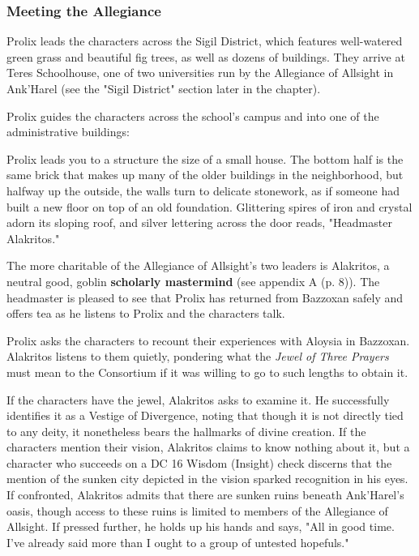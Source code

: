 \documentclass[letterpaper, 11pt, bg=full, twocolumn]{dndbook}
\begin{document}
\subsubsection{Meeting the Allegiance}

Prolix leads the characters across the Sigil District, which features well-watered green grass and beautiful fig trees, as well as dozens of buildings. They arrive at Teres Schoolhouse, one of two universities run by the Allegiance of Allsight in Ank'Harel (see the "Sigil District" section later in the chapter).

Prolix guides the characters across the school's campus and into one of the administrative buildings:

\begin{DndReadAloud}
Prolix leads you to a structure the size of a small house. The bottom half is the same brick that makes up many of the older buildings in the neighborhood, but halfway up the outside, the walls turn to delicate stonework, as if someone had built a new floor on top of an old foundation. Glittering spires of iron and crystal adorn its sloping roof, and silver lettering across the door reads, "Headmaster Alakritos."
\end{DndReadAloud}

The more charitable of the Allegiance of Allsight's two leaders is Alakritos, a neutral good, goblin \textbf{scholarly mastermind} (see appendix A (p. 8)). The headmaster is pleased to see that Prolix has returned from Bazzoxan safely and offers tea as he listens to Prolix and the characters talk.

Prolix asks the characters to recount their experiences with Aloysia in Bazzoxan. Alakritos listens to them quietly, pondering what the \textit{Jewel of Three Prayers} must mean to the Consortium if it was willing to go to such lengths to obtain it.

If the characters have the jewel, Alakritos asks to examine it. He successfully identifies it as a Vestige of Divergence, noting that though it is not directly tied to any deity, it nonetheless bears the hallmarks of divine creation. If the characters mention their vision, Alakritos claims to know nothing about it, but a character who succeeds on a DC 16 Wisdom (Insight) check discerns that the mention of the sunken city depicted in the vision sparked recognition in his eyes. If confronted, Alakritos admits that there are sunken ruins beneath Ank'Harel's oasis, though access to these ruins is limited to members of the Allegiance of Allsight. If pressed further, he holds up his hands and says, "All in good time. I've already said more than I ought to a group of untested hopefuls."
\end{document}
